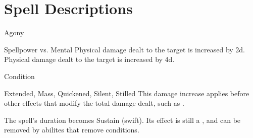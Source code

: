 \section{Spell Descriptions}
\begin{spellsection}{Agony}
\begin{spellheader}
\end{spellheader}
\begin{spellcontent}
\begin{spelltargetinginfo}
\end{spelltargetinginfo}
\begin{spelleffects}
\begin{spellattack}{Spellpower vs. Mental}
\spellsuccess Physical damage dealt to the target is increased by \plus2d.
\spellcritical Physical damage dealt to the target is increased by \plus4d.
\end{spellattack}
\spelldur Condition
\end{spelleffects}
\end{spellcontent}
\begin{spellfooter}
 Extended, Mass, Quickened, Silent, Stilled
\spellnotes This damage increase applies before other effects that modify the total damage dealt, such as .
\end{spellfooter}
\begin{spellsubcontent}
\begin{spellcantrip}
The spell's duration becomes Sustain (swift).
Its effect is still a , and can be removed by abilites that remove conditions.
\end{spellcantrip}
\end{spellsubcontent}
\end{spellsection}
